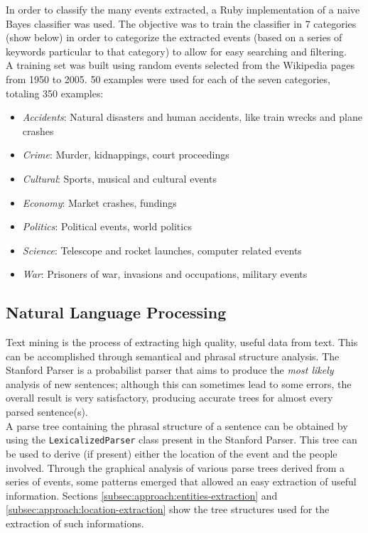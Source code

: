 \documentclass{llncs}
\begin{document}
In order to classify the many events extracted, a Ruby implementation of a naive Bayes classifier\cite{classifier} was used. The objective was to train the classifier in 7 categories (show below) in order to categorize the extracted events (based on a series of keywords particular to that category) to allow for easy searching and filtering.\\

A training set was built using random events selected from the Wikipedia pages from 1950 to 2005. 50 examples were used for each of the seven categories, totaling 350 examples:

\begin{itemize}
	\item \textit{Accidents}: Natural disasters and human accidents, like train wrecks and plane crashes
	\item \textit{Crime}: Murder, kidnappings, court proceedings
	\item \textit{Cultural}: Sports, musical and cultural events
	\item \textit{Economy}: Market crashes, fundings
	\item \textit{Politics}: Political events, world politics
	\item \textit{Science}: Telescope and rocket launches, computer related events
	\item \textit{War}: Prisoners of war, invasions and occupations, military events
\end{itemize}

\subsection{Natural Language Processing}
\label{subsec:approach:nlp}

Text mining is the process of extracting high quality, useful data from text. This can be accomplished through semantical and phrasal structure analysis. The Stanford Parser is a probabilist parser that aims to produce the \textit{most likely} analysis of new sentences; although this can sometimes lead to some errors, the overall result is very satisfactory, producing accurate trees for almost every parsed sentence(s).\\

A parse tree containing the phrasal structure of a sentence can be obtained by using the \verb!LexicalizedParser! class present in the Stanford Parser. This tree can be used to derive (if present) either the location of the event and the people involved. Through the graphical analysis of various parse trees derived from a series of events, some patterns emerged that allowed an easy extraction of useful information. Sections \ref{subsec:approach:entities-extraction} and \ref{subsec:approach:location-extraction} show the tree structures used for the extraction of such informations.\cite{santorini}\cite{bies}\\
\end{document}
